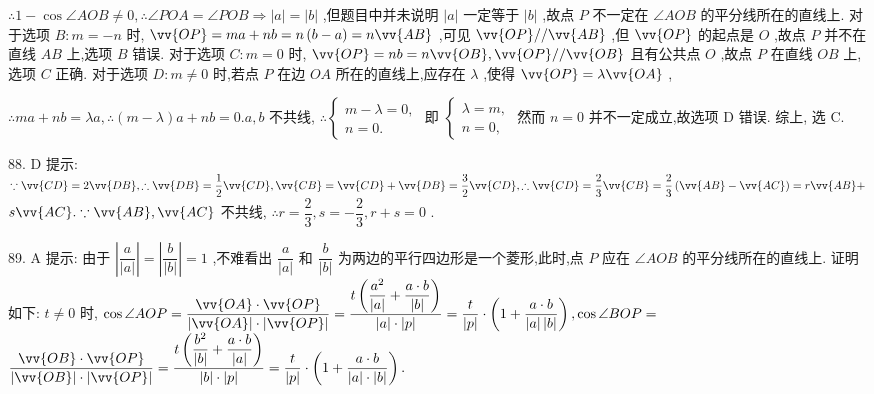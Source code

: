 $\therefore 1 - \cos \angle {AOB} \neq  0,\therefore \angle {POA} = \angle {POB} \Rightarrow  \left| a\right|  = \left| b\right|$ ,但题目中并未说明 $\left| a\right|$ 一定等于 $\left| b\right|$ ,故点 $P$ 不一定在 $\angle {AOB}$ 的平分线所在的直线上. 对于选项 $B : m =  - n$ 时, $\vv{OP} = {ma} + {nb} = n\left( {b - a}\right)  = n\vv{AB}$ ,可见 $\vv{OP}//\vv{AB}$ ,但 $\vv{OP}$ 的起点是 $O$ ,故点 $P$ 并不在直线 ${AB}$ 上,选项 $B$ 错误. 对于选项 $C : m = 0$ 时, $\vv{OP} = {nb} = n\vv{OB},\vv{OP}//\vv{OB}$ 且有公共点 $O$ ,故点 $P$ 在直线 ${OB}$ 上,选项 $C$ 正确. 对于选项 $D : m \neq  0$ 时,若点 $P$ 在边 ${OA}$ 所在的直线上,应存在 $\lambda$ ,使得 $\vv{OP} = \lambda \vv{OA}$ ,

$\therefore {ma} + {nb} = {\lambda a},\therefore \left( {m - \lambda }\right) a + {nb} = 0.a,b$ 不共线, $\therefore \left\{  \begin{array}{l} m - \lambda  = 0, \\  n = 0. \end{array}\right.$ 即 $\left\{  \begin{array}{l} \lambda  = m, \\  n = 0, \end{array}\right.$ 然而 $n = 0$ 并不一定成立,故选项 D 错误. 综上, 选 C.

88. D 提示: $\because \vv{CD} = 2\vv{DB},\therefore \vv{DB} = \dfrac{1}{2}\vv{CD},\vv{CB} = \vv{CD} + \vv{DB} = \dfrac{3}{2}\vv{CD},\therefore \vv{CD} = \dfrac{2}{3}\vv{CB} = \dfrac{2}{3}\left( {\vv{AB} - \vv{AC}}\right)  = r\vv{AB} +$  $s\vv{AC}.\because \vv{AB},\vv{AC}$ 不共线, $\therefore r = \dfrac{2}{3},s =  - \dfrac{2}{3},r + s = 0$ .

89. A 提示: 由于 $\left| \dfrac{a}{\left| a\right| }\right|  = \left| \dfrac{b}{\left| b\right| }\right|  = 1$ ,不难看出 $\dfrac{a}{\left| a\right| }$ 和 $\dfrac{b}{\left| b\right| }$ 为两边的平行四边形是一个菱形,此时,点 $P$ 应在 $\angle {AOB}$ 的平分线所在的直线上. 证明如下: $t \neq  0$ 时, $\cos \angle {AOP} = \dfrac{\vv{OA} \cdot  \vv{OP}}{\left| \vv{OA}\right|  \cdot  \left| \vv{OP}\right| } = \dfrac{t\left( {\dfrac{{a}^{2}}{\left| a\right| } + \dfrac{a \cdot  b}{\left| b\right| }}\right) }{\left| a\right|  \cdot  \left| p\right| } = \dfrac{t}{\left| p\right| } \cdot  \left( {1 + \dfrac{a \cdot  b}{\left| a\right| \left| b\right| }}\right) ,\cos \angle {BOP} =$  $\dfrac{\vv{OB} \cdot  \vv{OP}}{\left| \vv{OB}\right|  \cdot  \left| \vv{OP}\right| } = \dfrac{t\left( {\dfrac{{b}^{2}}{\left| b\right| } + \dfrac{a \cdot  b}{\left| a\right| }}\right) }{\left| b\right|  \cdot  \left| p\right| } = \dfrac{t}{\left| p\right| } \cdot  \left( {1 + \dfrac{a \cdot  b}{\left| a\right|  \cdot  \left| b\right| }}\right) .$

